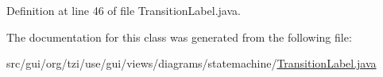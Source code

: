 Definition at line 46 of file Transition\-Label.\-java.



The documentation for this class was generated from the following file\-:\begin{DoxyCompactItemize}
\item 
src/gui/org/tzi/use/gui/views/diagrams/statemachine/\hyperlink{_transition_label_8java}{Transition\-Label.\-java}\end{DoxyCompactItemize}
